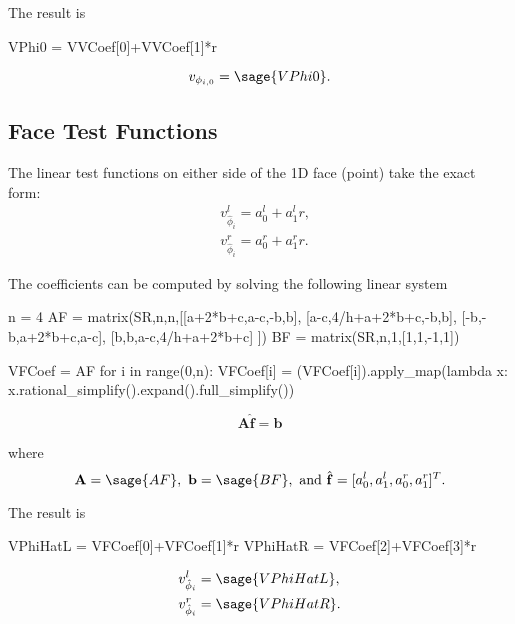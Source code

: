 \documentclass{article}
\numberwithin{equation}{section}
\newcommand{\vect}[1]{\mathbf{{#1}}}
\newcommand{\mat}[1]{\mathbf{{#1}}}
\begin{document}
The result is
\begin{sagesilent}
VPhi0 = VVCoef[0]+VVCoef[1]*r
\end{sagesilent}

\[
v_{{\phi}_{i,0}} = \sage{VPhi0}.
\]

\subsection{Face Test Functions}

The linear test functions on either side of the 1D face (point) take the exact form:
\begin{align*}
& v_{\hat{\phi}_i}^l = a_0^l + a_1^l r,\\
& v_{\hat{\phi}_i}^r = a_0^r + a_1^r r.
\end{align*}

The coefficients can be computed by solving the following linear system

\begin{sagesilent}
n = 4
AF = matrix(SR,n,n,[[a+2*b+c,a-c,-b,b],
                    [a-c,4/h+a+2*b+c,-b,b],
                    [-b,-b,a+2*b+c,a-c],
                    [b,b,a-c,4/h+a+2*b+c]
                   ])
BF = matrix(SR,n,1,[1,1,-1,1])

VFCoef = AF\BF
for i in range(0,n):
    VFCoef[i] = (VFCoef[i]).apply_map(lambda x: x.rational_simplify().expand().full_simplify())
\end{sagesilent}

\[
\mat{A} \hat{\vect{f}} = \vect{b}
\]

where
\[
\mat{A} = \sage{AF},\ \vect{b} = \sage{BF},\ \text{and}\ \hat{\vect{f}} = [a_0^l,a_1^l,a_0^r,a_1^r]^T.
\]

The result is
\begin{sagesilent}
VPhiHatL = VFCoef[0]+VFCoef[1]*r
VPhiHatR = VFCoef[2]+VFCoef[3]*r
\end{sagesilent}

\begin{align*}
& v_{\hat{\phi}_i}^l = \sage{VPhiHatL}, \\
& v_{\hat{\phi}_i}^r = \sage{VPhiHatR}.
\end{align*}




%
%
\end{document}

